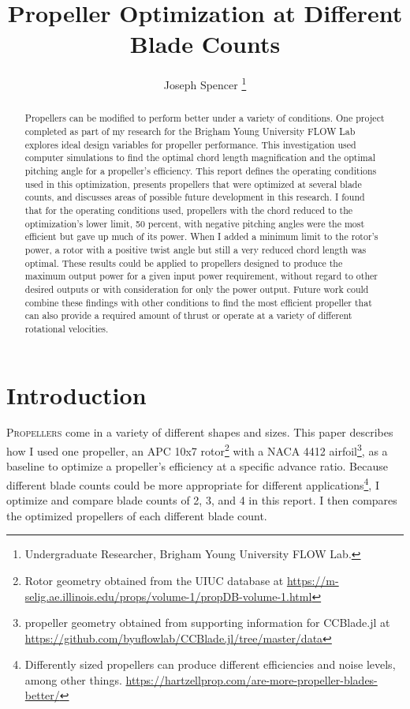 \documentclass[journal ]{new-aiaa}
\title{Propeller Optimization at Different Blade Counts}
\author{Joseph Spencer \footnote{Undergraduate Researcher, Brigham Young University FLOW Lab.}}
\affil{Brigham Young University, Provo, Utah, 84601}
\begin{document}
\maketitle

\begin{abstract}

Propellers can be modified to perform better under a variety of conditions. One project completed as part of my research for the Brigham Young University FLOW Lab explores ideal design variables for propeller performance. This investigation used computer simulations to find the optimal chord length magnification and the optimal pitching angle for a propeller's efficiency. This report defines the operating conditions used in this optimization, presents propellers that were optimized at several blade counts, and discusses areas of possible future development in this research. I found that for the operating conditions used, propellers with the chord reduced to the optimization's lower limit, 50 percent, with negative pitching angles were the most efficient but gave up much of its power. When I added a minimum limit to the rotor's power, a rotor with a positive twist angle but still a very reduced chord length was optimal. These results could be applied to propellers designed to produce the maximum output power for a given input power requirement, without regard to other desired outputs or with consideration for only the power output. Future work could combine these findings with other conditions to find the most efficient propeller that can also provide a required amount of thrust or operate at a variety of different rotational velocities.

\end{abstract}


\section{Introduction}

\lettrine{P}{ropellers} come in a variety of different shapes and sizes. This paper describes how I used one propeller, an APC 10x7 rotor\footnote{Rotor geometry obtained from the UIUC database at \url{https://m-selig.ae.illinois.edu/props/volume-1/propDB-volume-1.html}} with a NACA 4412 airfoil\footnote{propeller geometry obtained from supporting information for CCBlade.jl at \url{https://github.com/byuflowlab/CCBlade.jl/tree/master/data}}, as a baseline to optimize a propeller's efficiency at a specific advance ratio. Because different blade counts could be more appropriate for different applications\footnote{Differently sized propellers can produce different efficiencies and noise levels, among other things. \url{https://hartzellprop.com/are-more-propeller-blades-better/}}, I optimize and compare blade counts of 2, 3, and 4 in this report. I then compares the optimized propellers of each different blade count.
\end{document}
